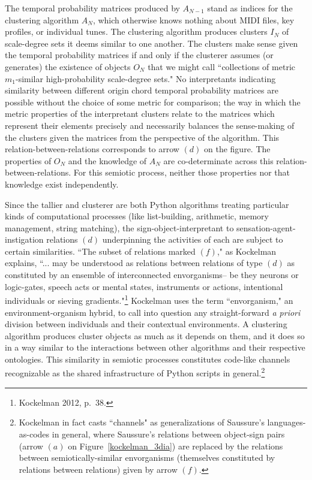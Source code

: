 The temporal probability matrices produced by $A_{N-1}$ stand as indices for the clustering algorithm $A_{N}$, which otherwise knows nothing about MIDI files, key profiles, or individual tunes.  The clustering algorithm produces clusters $I_{N}$ of scale-degree sets it deems similar to one another.  The clusters make sense given the temporal probability matrices if and only if the clusterer assumes (or generates) the existence of objects $O_N$ that we might call ``collections of metric $m_1$-similar high-probability scale-degree sets."  No interpretants indicating similarity between different origin chord temporal probability matrices are possible without the choice of some metric for comparison; the way in which the metric properties of the interpretant clusters relate to the matrices which represent their elements precisely and necessarily balances the sense-making of the clusters given the matrices from the perspective of the algorithm.  This relation-between-relations corresponds to arrow $(d)$ on the figure.  The properties of $O_N$ and the knowledge of $A_N$ are co-determinate across this relation-between-relations.  For this semiotic process, neither those properties nor that knowledge exist independently.

Since the tallier and clusterer are both Python algorithms treating particular kinds of computational processes (like list-building, arithmetic, memory management, string matching), the sign-object-interpretant to sensation-agent-instigation relations $(d)$ underpinning the activities of each are subject to certain similarities.  ``The subset of relations marked $(f)$," as Kockelman explains, ``... may be understood as relations between relations of type $(d)$ as constituted by an ensemble of interconnected envorganisms-- be they neurons or logic-gates, speech acts or mental states, instruments or actions, intentional individuals or sieving gradients."\footnote{Kockelman 2012, p.\ 38.}  Kockelman uses the term ``envorganism," an environment-organism hybrid, to call into question any straight-forward \emph{a priori} division between individuals and their contextual environments.  A clustering algorithm produces cluster objects as much as it depends on them, and it does so in a way similar to the interactions between other algorithms and their respective ontologies.  This similarity in semiotic processes constitutes code-like channels recognizable as the shared infrastructure of Python scripts in general.\footnote{Kockelman in fact casts ``channels" as generalizations of Saussure's languages-as-codes in general, where Saussure's relations between object-sign pairs (arrow $(a)$ on Figure~\ref{kockelman_3dia}) are replaced by the relations between semiotically-similar envorganisms (themselves constituted by relations between relations) given by arrow $(f)$.}

